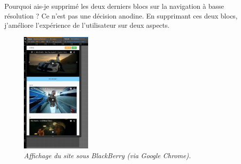 \documentclass{article}
\begin{document}
\newpage

\hspace*{0.6cm}Pourquoi ais-je supprim\'e les deux derniers blocs sur la navigation \`a basse r\'esolution ? Ce n'est pas une d\'ecision anodine. En supprimant ces deux blocs, j'am\'eliore l'exp\'erience de l'utilisateur sur deux aspects.\\
\begin{figure}
\vspace{-40pt}
\centering
\caption{\textit{Affichage du site sous BlackBerry (via Google Chrome).}}
\includegraphics[width=3.5cm]{blackberry}
\end{figure} 
\end{document}
